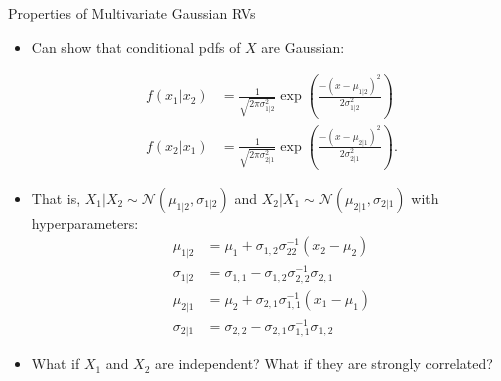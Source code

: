 \documentclass[9pt]{beamer}
\begin{document}
%
\begin{frame}{Properties of Multivariate Gaussian RVs}

\begin{itemize}

\item Can show that conditional pdfs of $X$ are Gaussian:
\begin{block}{}
\begin{align*}
f(x_1|x_2)&=\frac{1}{\sqrt{2\pi\sigma_{1|2}^2}}\exp \left({\frac{-(x-\mu_{1|2})^2}{2\sigma_{1|2}^2}}\right)\\
f(x_2|x_1)&=\frac{1}{\sqrt{2\pi\sigma_{2|1}^2}}\exp \left({\frac{-(x-\mu_{2|1})^2}{2\sigma_{2|1}^2}}\right).
\end{align*} 
\end{block}
\item That is, $X_1|X_2\sim \mathcal{N}(\mu_{1|2},\sigma_{1|2})$ and $X_2|X_1\sim \mathcal{N}(\mu_{2|1},\sigma_{2|1})$ with hyperparameters:
\begin{align*}
\mu_{1|2}&=\mu_1+\sigma_{1,2}\sigma_{22}^{-1}(x_2-\mu_2)\\
\sigma_{1|2}&=\sigma_{1,1}-\sigma_{1,2}\sigma_{2,2}^{-1}\sigma_{2,1}\\
\mu_{2|1}&=\mu_2+\sigma_{2,1}\sigma_{1,1}^{-1}(x_1-\mu_1)\\
\sigma_{2|1}&=\sigma_{2,2}-\sigma_{2,1}\sigma_{1,1}^{-1}\sigma_{1,2}
\end{align*}
\item What  if $X_1$ and $X_2$ are independent? What  if they are strongly correlated?
\end{itemize}

\end{frame}
\end{document}
